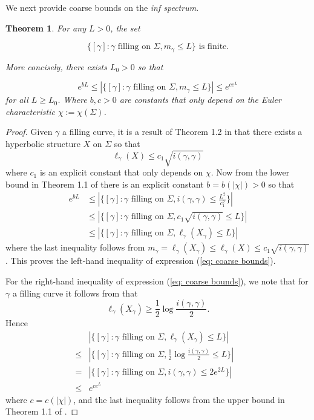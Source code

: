 \documentclass[12pt]{amsart}
\numberwithin{equation}{section}
\theoremstyle{plain}
\newtheorem{thm}{Theorem}[section]
\begin{document}
We next provide coarse bounds on the {\it inf spectrum}. 


\begin{thm}\label{thm: inf spec bounds}
   For any $L>0$, the set

$$\{ [\gamma]:\gamma \text{ filling on }\Sigma, m_{\gamma} \leq L \}  \text{ is finite.}$$

 More concisely,  there exists $L_{0}>0$ so that 

\begin{equation}\label{eq: coarse bounds}
e^{bL}\leq
|\{ [\gamma]:\gamma \text{ filling on }\Sigma,m_{\gamma}\leq L \}|
\leq e^{ce^{L}} 
\end{equation}
for all  $L \geq L_{0}$.
Where $b,c>0$ are constants that only depend on the Euler characteristic $\chi :=\chi(\Sigma)$.
\end{thm}

\begin{proof}
Given $\gamma$ a filling curve, it is a result of  Theorem 1.2 in \cite{souto2018counting} that there exists a hyperbolic structure   $X$   on $\Sigma$ so that 
$$
\ell_{\gamma}(X) \leq c_{1} \sqrt{i(\gamma,\gamma)}
$$
where $c_{1}$ is an explicit constant that only depends on 
$\chi$.
Now  from the lower bound in Theorem 1.1 of  \cite{souto2018counting} there is an explicit constant
$b=b(|\chi|)>0$  so that 
\begin{align*}
e^{bL} &  \leq  |\{[\gamma] : \gamma  
  \text{ filling on }\Sigma, i(\gamma, \gamma)  \leq
  \frac{L^{2}}{c_{1}^{2}}\}| \\
& \leq |\{ [\gamma]:\gamma \text{ filling on }\Sigma, 
c_{1} \sqrt{i(\gamma,\gamma)} \leq L \}| \\
&\leq 
|\{ [\gamma]:\gamma \text{ filling on }\Sigma, \ell_{\gamma}(X_{\gamma}) \leq L \}|
\end{align*}
where the last inequality follows from 
$m_{\gamma}=\ell_{\gamma}(X_{\gamma})\leq \ell_{\gamma}(X)\leq c_{1} \sqrt{i(\gamma,\gamma)}$.
This proves the left-hand  inequality of expression (\ref{eq: coarse bounds}).

For the right-hand inequality of expression (\ref{eq: coarse bounds}),
 we note that for $\gamma$
a filling curve  it follows from \cite{basmajian2013universal} that 
$$\ell_{\gamma}(X_{\gamma}) \geq \frac{1}{2}
\log{\frac{i(\gamma,\gamma)}{2}}.
$$
Hence
\begin{align*}
&|\{ [\gamma]:\gamma \text{ filling on }\Sigma, \ell_{\gamma}(X_{\gamma}) \leq L \}| & \\
    \leq  &  |\{ [\gamma]:\gamma \text{ filling on }\Sigma, \frac{1}{2}
\log{\frac{i(\gamma,\gamma)}{2}} \leq L \}|& \\
= & |\{ [\gamma]:\gamma \text{ filling on }\Sigma, 
i(\gamma,\gamma) \leq 2e^{2L} \}| \\
\leq & e^{ce^{L}} 
\end{align*}
   where $c=c(|\chi |)$, and the last inequality follows from 
the upper bound in Theorem 1.1 of \cite{souto2018counting}.
\end{proof}
\end{document}
